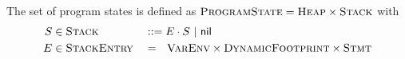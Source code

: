 The set of program states is defined as $\textup{\textsc{ProgramState}} = \textup{\textsc{Heap}} \times \textup{\textsc{Stack}}$ with
\begin{align*}
	S & \in \textup{\textsc{Stack}}      &  & ::= E \cdot S ~|~ \textup{\textsf{nil}}                               \\
	E & \in \textup{\textsc{StackEntry}} &  & =~~ \textup{\textsc{VarEnv}} \times \textup{\textsc{DynamicFootprint}} \times \textup{\textsc{Stmt}}
\end{align*}

\begin{comment}
REQUIRED?
\begin{definition}[Topmost Stack Entry]
    Let $\topmost : \setStack \rightharpoonup \setStackEntry$ be defined as
    \begin{align*}
    &\topmost(E \cdot S) = E\\
    &\topmost(\nil) \quad\textit{ undefined}
    \end{align*}
\end{definition}
\end{comment}


\begin{comment}
Program states with scheduled statement $s$ are defined as
\begin{displaymath}
\setProgramState_s ~\defeq~ \setHeap ~\times~ \{~~ (\rho, A_d, s) \cdot S ~~|~~ \rho \in \setVarEnv,~ A_d \in \setDFootprint,~ S \in \setStack ~~\}
\end{displaymath}
\end{comment}